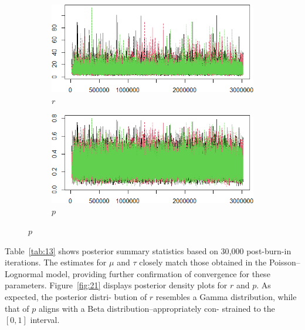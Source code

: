 \documentclass{Class/julia}
\begin{document}
\begin{figure}[!ht]
    \begin{subfigure}{0.45\textwidth}
        \centering
        \includegraphics[width=\textwidth]{itamtplcost_nb/trace_after_thinning_r.png}
        \caption{\( r \)}
    \end{subfigure}
    \hfill
    \begin{subfigure}{0.45\textwidth}
        \centering
        \includegraphics[width=\textwidth]{itamtplcost_nb/trace_after_thinning_p.png}
        \caption{\( p \)}
    \end{subfigure}
\end{figure}

Table~\ref{tab:13} shows posterior summary statistics based on 30{,}000 post-burn-in iterations. The estimates for \( \mu \) and \( \tau \) closely match those obtained in the Poisson--Lognormal model, providing further confirmation of convergence for these parameters. Figure~\ref{fig:21} displays posterior density plots for \( r \) and \( p \). As expected, the posterior distri- bution of \( r \) resembles a Gamma distribution, while that of \( p \) aligns with a Beta distribution--appropriately con- strained to the \([0, 1]\) interval.
\end{document}
